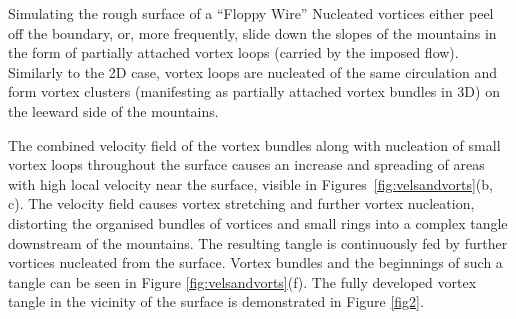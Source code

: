 \begin{chapter}{\label{cha:afm}Simulating the rough surface of a ``Floppy Wire''}
Nucleated vortices either peel off the boundary, or, more frequently, slide
down the slopes of the mountains in the form of partially attached vortex loops (carried by the imposed flow). Similarly to the 2D case, vortex loops are nucleated of the same circulation and form vortex clusters (manifesting as partially attached vortex bundles in 3D) on the leeward side of the mountains.

The combined velocity field of the vortex bundles along with nucleation of small vortex loops throughout the surface causes an increase and spreading of areas with high local velocity near the surface, visible in Figures~\ref{fig:velsandvorts}(b, c). The velocity field causes vortex stretching and further vortex nucleation, distorting the organised bundles of vortices and small rings into a complex tangle downstream of the mountains. The resulting tangle is continuously fed by further vortices nucleated from the surface. Vortex bundles and the beginnings of such a tangle can be seen in Figure \ref{fig:velsandvorts}(f). The fully developed vortex tangle in the vicinity of the surface is demonstrated in Figure \ref{fig2}.


\end{chapter}
